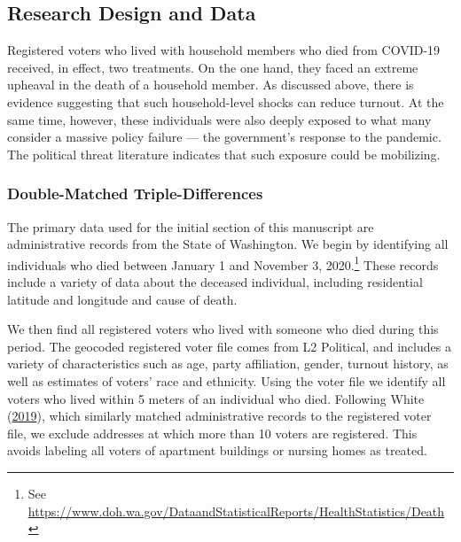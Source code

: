 \documentclass[
  12pt,
]{article}
\begin{document}
\hypertarget{research-design-and-data}{%
\subsection*{Research Design and Data}\label{research-design-and-data}}

Registered voters who lived with household members who died from COVID-19 received, in effect, two treatments. On the one hand, they faced an extreme upheaval in the death of a household member. As discussed above, there is evidence suggesting that such household-level shocks can reduce turnout. At the same time, however, these individuals were also deeply exposed to what many consider a massive policy failure --- the government's response to the pandemic. The political threat literature indicates that such exposure could be mobilizing.

\hypertarget{double-matched-triple-differences}{%
\subsubsection*{Double-Matched Triple-Differences}\label{double-matched-triple-differences}}

The primary data used for the initial section of this manuscript are administrative records from the State of Washington. We begin by identifying all individuals who died between January 1 and November 3, 2020.\footnote{See \url{https://www.doh.wa.gov/DataandStatisticalReports/HealthStatistics/Death}} These records include a variety of data about the deceased individual, including residential latitude and longitude and cause of death.

We then find all registered voters who lived with someone who died during this period. The geocoded registered voter file comes from L2 Political, and includes a variety of characteristics such as age, party affiliation, gender, turnout history, as well as estimates of voters' race and ethnicity. Using the voter file we identify all voters who lived within 5 meters of an individual who died. Following White (\protect\hyperlink{ref-White2019a}{2019}), which similarly matched administrative records to the registered voter file, we exclude addresses at which more than 10 voters are registered. This avoids labeling all voters of apartment buildings or nursing homes as treated.
\end{document}
